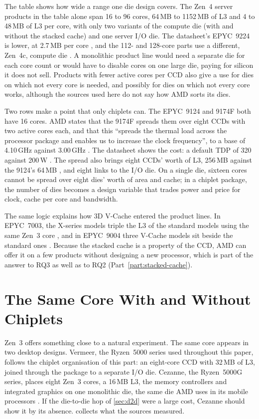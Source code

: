 The table shows how wide a range one die design covers. The Zen~4 server products in the table alone span 16 to 96 cores, 64\,MB to 1152\,MB of L3 and 4 to 48\,MB of L3 per core, with only two variants of the compute die (with and without the stacked cache) and one server I/O die. The datasheet's EPYC~9224 is lower, at 2.7\,MB per core \cite{advancedmicrodevicesinc.AMDEPYC90042023}, and the 112- and 128-core parts use a different, Zen~4c, compute die \cite{advancedmicrodevicesinc.4thGenAMD2023}. A monolithic product line would need a separate die for each core count or would have to disable cores on one large die, paying for silicon it does not sell. Products with fewer active cores per CCD also give a use for dies on which not every core is needed, and possibly for dies on which not every core works, although the sources used here do not say how AMD sorts its dies.

Two rows make a point that only chiplets can. The EPYC~9124 and 9174F both have 16 cores. AMD states that the 9174F spreads them over eight CCDs with two active cores each, and that this ``spreads the thermal load across the processor package and enables us to increase the clock frequency'', to a base of 4.10\,GHz against 3.00\,GHz \cite{advancedmicrodevicesinc.4thGenAMD2023}. The datasheet shows the cost: a default TDP of 320 against 200\,W \cite{advancedmicrodevicesinc.AMDEPYC90042023}. The spread also brings eight CCDs' worth of L3, 256\,MB against the 9124's 64\,MB \cite{advancedmicrodevicesinc.AMDEPYC90042023}, and eight links to the I/O die. On a single die, sixteen cores cannot be spread over eight dies' worth of area and cache; in a chiplet package, the number of dies becomes a design variable that trades power and price for clock, cache per core and bandwidth.

The same logic explains how 3D V-Cache entered the product lines. In EPYC~7003, the X-series models triple the L3 of the standard models using the same Zen~3 core \cite[sec.~1.1]{amd2022epyc7003}, and in EPYC~9004 three V-Cache models sit beside the standard ones \cite{advancedmicrodevicesinc.AMDEPYC90042023}. Because the stacked cache is a property of the CCD, AMD can offer it on a few products without designing a new processor, which is part of the answer to RQ3 as well as to RQ2 (Part~\ref{part:stacked-cache}).

\section{The Same Core With and Without Chiplets}
\label{sec:cezanne}
Zen~3 offers something close to a natural experiment. The same core appears in two desktop designs. Vermeer, the Ryzen~5000 series used throughout this paper, follows the chiplet organisation of this part: an eight-core CCD with 32\,MB of L3, joined through the package to a separate I/O die. Cezanne, the Ryzen~5000G series, places eight Zen~3 cores, a 16\,MB L3, the memory controllers and integrated graphics on one monolithic die, the same die AMD uses in its mobile processors \cite{waltonAMDRyzen72021}. If the die-to-die hop of \cref{sec:d2d} were a large cost, Cezanne should show it by its absence.  collects what the sources measured.

